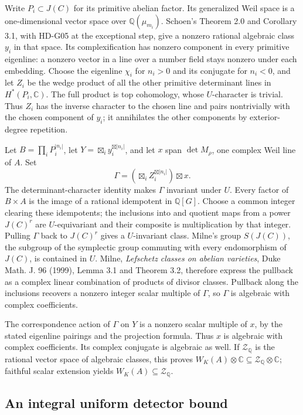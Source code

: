 Write $P_i\subset J(C)$ for its primitive abelian factor. Its generalized
Weil space is a one-dimensional vector space over $\mathbb Q(\mu_{m_i})$.
Schoen's Theorem 2.0 and Corollary 3.1, with HD-G05 at the exceptional
step, give a nonzero rational algebraic class $y_i$ in that space.
Its complexification has nonzero component in every primitive eigenline:
a nonzero vector in a line over a number field stays nonzero under each
embedding. Choose the eigenline $\chi_i$ for $n_i>0$ and its conjugate
for $n_i<0$, and let $Z_i$ be the wedge product of all the other
primitive determinant lines in $H^*(P_i,\mathbb C)$. The full product
is top cohomology, whose $U$-character is trivial. Thus $Z_i$ has the
inverse character to the chosen line and pairs nontrivially with the
chosen component of $y_i$; it annihilates the other components by
exterior-degree repetition.

Let $B=\prod_iP_i^{|n_i|}$, let $Y=\boxtimes_i y_i^{\boxtimes|n_i|}$,
and let $x$ span $\det M_\rho$, one complex Weil line of $A$. Set
\[
\Gamma=\left(\boxtimes_iZ_i^{\boxtimes|n_i|}\right)\boxtimes x.
\]
The determinant-character identity makes $\Gamma$ invariant under $U$.
Every factor of $B\times A$ is the image of a rational idempotent
in $\mathbb Q[G]$. Choose a common integer clearing these idempotents;
the inclusions into and quotient maps from a power $J(C)^r$ are
$U$-equivariant and their composite is multiplication by that integer.
Pulling $\Gamma$ back to $J(C)^r$ gives a $U$-invariant class.
Milne's group $S(J(C))$, the subgroup of the symplectic group commuting
with every endomorphism of $J(C)$, is contained in $U$. Milne,
\emph{Lefschetz classes on abelian varieties}, Duke Math. J. 96 (1999),
Lemma 3.1 and Theorem 3.2, therefore express the pullback as a complex
linear combination of products of divisor classes. Pullback along the
inclusions recovers a nonzero integer scalar multiple of $\Gamma$,
so $\Gamma$ is algebraic with complex coefficients.

The correspondence action of $\Gamma$ on $Y$ is a nonzero scalar multiple
of $x$, by the stated eigenline pairings and the projection formula.
Thus $x$ is algebraic with complex coefficients. Its complex conjugate
is algebraic as well. If $\mathcal Z_{\mathbb Q}$ is the rational vector
space of algebraic classes, this proves
$W_K(A)\otimes\mathbb C\subseteq\mathcal Z_{\mathbb Q}\otimes\mathbb C$;
faithful scalar extension yields $W_K(A)\subseteq\mathcal Z_{\mathbb Q}$.

\subsection{An integral uniform detector bound}

